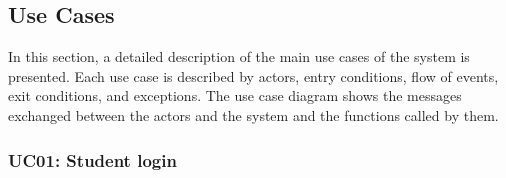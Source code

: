 \subsection{Use Cases}
\label{subsec:use-cases}

\par In this section, a detailed description of the main use cases of the system is presented.
Each use case is described by actors, entry conditions, flow of events, exit conditions, and exceptions.
The use case diagram shows the messages exchanged between the actors and the system and the functions called by them.


\subsubsection{UC01: Student login}
\label{subsubsec:student-login}
